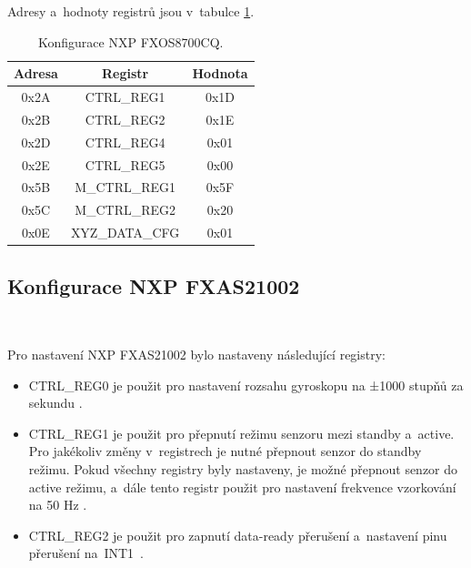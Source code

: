 Adresy a~hodnoty registrů jsou v~tabulce \ref{tab:FXOS8700CQ}.

\begin{table}[!h]
    \centering
	\begin{tabular}{ccc}
        \hline
        \textbf{Adresa} & \textbf{Registr} & \textbf{Hodnota} \\
        \hline
        0x2A            & CTRL\_REG1       & 0x1D             \\
        0x2B            & CTRL\_REG2       & 0x1E             \\
        0x2D            & CTRL\_REG4       & 0x01             \\
        0x2E            & CTRL\_REG5       & 0x00             \\
        0x5B            & M\_CTRL\_REG1    & 0x5F             \\
        0x5C            & M\_CTRL\_REG2    & 0x20             \\
        0x0E            & XYZ\_DATA\_CFG   & 0x01             \\
        \hline
    \end{tabular}
    \caption{Konfigurace NXP FXOS8700CQ\cite{FXOS8700CQ}.}
    \label{tab:FXOS8700CQ}
\end{table}

\subsection{Konfigurace NXP FXAS21002}\

Pro nastavení NXP FXAS21002 bylo nastaveny následující registry: 

\begin{itemize}
    \item CTRL\_REG0 je použit pro nastavení rozsahu gyroskopu na ±1000 stupňů za
    sekundu \cite{FXAS21002}.

    \item CTRL\_REG1 je použit pro přepnutí režimu senzoru mezi standby a~active.
    Pro jakékoliv změny v~registrech je nutné přepnout senzor do standby režimu.
    Pokud všechny registry byly nastaveny, je možné přepnout senzor do active
    režimu, a~dále tento registr použit pro nastavení frekvence vzorkování na 50
    Hz \cite{FXAS21002}.

    \item CTRL\_REG2 je použit pro zapnutí data-ready přerušení a~nastavení pinu
    přerušení na~INT1~\cite{FXAS21002}.
\end{itemize}

